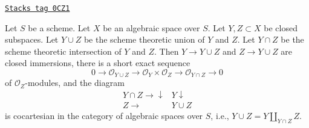 \begin{lemma}
\label{spaces-morphisms-lemma-scheme-theoretic-union}
\href{https://stacks.math.columbia.edu/tag/0CZ1}{\texttt{Stacks tag 0CZ1}}

Let $S$ be a scheme. Let $X$ be an algebraic space over $S$.
Let $Y, Z \subset X$ be closed subspaces.
Let $Y \cup Z$ be the scheme theoretic union of $Y$ and $Z$.
Let $Y \cap Z$ be the scheme theoretic intersection of $Y$ and $Z$.
Then $Y \to Y \cup Z$ and $Z \to Y \cup Z$ are closed immersions,
there is a short exact sequence
$$
0 \to \mathcal{O}_{Y \cup Z} \to \mathcal{O}_Y \times \mathcal{O}_Z
\to \mathcal{O}_{Y \cap Z} \to 0
$$
of $\mathcal{O}_Z$-modules, and the diagram
$$
\begin{array}{cc}Y \cap Z \longrightarrow\downarrow & Y \downarrow \\ Z \longrightarrow & Y \cup Z\end{array}
$$
is cocartesian in the category of algebraic spaces over $S$, i.e.,
$Y \cup Z = Y \amalg_{Y \cap Z} Z$.
\end{lemma}

